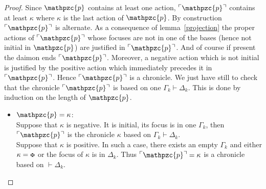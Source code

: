 \documentclass{LMCS}
\newcommand{\design}[1]{{\mathfrak{#1}}}
\newcommand{\pathLL}[1]{\mathpzc{#1}}\newcommand{\strategy}[1]{\pathLL{#1}}\newcommand{\view}[1]{\raisebox{.3ex}{$\ulcorner$}{#1}\raisebox{.3ex}{$\urcorner$}}\newcommand{\fullview}[1]{\raisebox{.3ex}{$\ulcorner\mkern-6mu\ulcorner\mkern-2mu$}{#1}\raisebox{.3ex}{$\mkern-2mu\urcorner\mkern-6mu\urcorner$}}\newcommand{\views}[1]{\view{#1}}\newcommand{\fullviews}[1]{\fullview{#1}}\newcommand{\shuffle}[1]{\llcorner\design{#1}\lrcorner}\newcommand{\PoD}[1]{{\mathcal{P}}_{#1}}\newcommand{\norm}[1]{\llbracket\design{#1}\rrbracket}
\begin{document}
\begin{proof}
Since $\pathLL{p}$ contains at least one action, $\view{\pathLL{p}}$ contains at least $\kappa$ where  $\kappa$ is the last action of $\pathLL{p}$.
By construction $\view{\pathLL{p}}$ is alternate.  As a consequence of lemma~\ref{projection} the proper actions of $\view{\pathLL{p}}$ whose focuses are not in one of the bases (hence not initial in $\pathLL{p}$) are justified in $\view{\pathLL{p}}$. And of course if present the daimon ends $\view{\pathLL{p}}$. Moreover, a negative action which is not initial is justified by the positive action which immediately precedes it in $\view{\pathLL{p}}$. Hence $\view{\pathLL{p}}$ is a chronicle.
We just have still to check that the chronicle $\view{\pathLL{p}}$ is based on one $\Gamma_k\vdash \Delta_k$. This is done by induction on the length of $\pathLL{p}$.
\begin{itemize}
\item $\pathLL{p}=\kappa$:\\
 Suppose that $\kappa$ is negative. It is initial, its focus is in one $\Gamma_k$, then $\view{\pathLL{p}}$ is the chronicle $\kappa$ based on $\Gamma_k\vdash\Delta_k$. 
 \\
 Suppose that $\kappa$ is positive. In such a case, there exists an empty $\Gamma_k$ and either $\kappa=\daimon$ or the focus of $\kappa$ is in $\Delta_k$. Thus $\view{\pathLL{p}}=\kappa$ is a chronicle based on $\vdash\Delta_k$. 


\end{itemize}
\end{proof}
\end{document}

